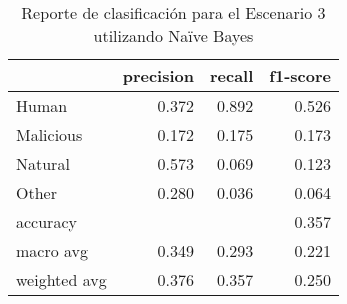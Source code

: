 \begin{table}
\centering
\caption{Reporte de clasificación para el Escenario 3 utilizando Naïve Bayes}
\label{tab:NB_Escenario 3}
\begin{tabular}{lrrr}
\toprule
{} &  precision &  recall &  f1-score \\
\midrule
Human        &      0.372 &   0.892 &     0.526 \\
Malicious    &      0.172 &   0.175 &     0.173 \\
Natural      &      0.573 &   0.069 &     0.123 \\
Other        &      0.280 &   0.036 &     0.064 \\
accuracy     &            &         &     0.357 \\
macro avg    &      0.349 &   0.293 &     0.221 \\
weighted avg &      0.376 &   0.357 &     0.250 \\
\bottomrule
\end{tabular}
\end{table}

